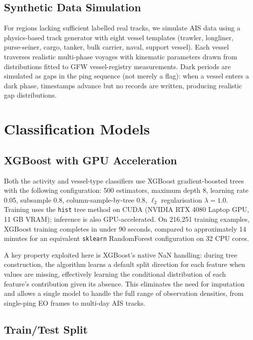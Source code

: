 \documentclass[journal]{IEEEtran}
\begin{document}
\subsection{Synthetic Data Simulation}

For regions lacking sufficient labelled real tracks, we simulate AIS
data using a physics-based track generator with eight vessel templates
(trawler, longliner, purse-seiner, cargo, tanker, bulk carrier, naval,
support vessel). Each vessel traverses realistic multi-phase voyages with
kinematic parameters drawn from distributions fitted to GFW vessel-registry
measurements.
%
Dark periods are simulated as gaps in the ping sequence (not merely a
flag): when a vessel enters a dark phase, timestamps advance but no
records are written, producing realistic gap distributions.

\section{Classification Models}
\label{sec:classification}

\subsection{XGBoost with GPU Acceleration}

Both the activity and vessel-type classifiers use XGBoost gradient-boosted
trees \cite{chen2016xgboost} with the following configuration:
500 estimators, maximum depth 8, learning rate 0.05, subsample 0.8,
column-sample-by-tree 0.8, $\ell_2$ regularisation $\lambda=1.0$.
%
Training uses the \texttt{hist} tree method on CUDA (NVIDIA RTX 4080
Laptop GPU, 11 GB VRAM); inference is also GPU-accelerated.
%
On 216,251 training examples, XGBoost training completes in under
90 seconds, compared to approximately 14 minutes for an equivalent
\texttt{sklearn} RandomForest configuration on 32 CPU cores.

A key property exploited here is XGBoost's native NaN handling: during
tree construction, the algorithm learns a default split direction for
each feature when values are missing, effectively learning the conditional
distribution of each feature's contribution given its absence. This
eliminates the need for imputation and allows a single model to handle
the full range of observation densities, from single-ping EO frames to
multi-day AIS tracks.

\subsection{Train/Test Split}
\end{document}
